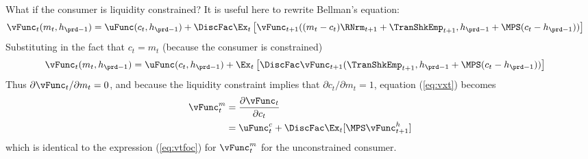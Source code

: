 \documentclass[\econtexRoot/SolvingMicroDSOPs]{subfiles}
\begin{document}
What if the consumer is liquidity constrained?  It is useful here to 
rewrite Bellman's equation:
\begin{equation}\begin{gathered}\begin{aligned}
  \vFunc_{t}(m_{t},h_{\prd-1})  & = \uFunc(c_{t},h_{\prd-1}) +  \DiscFac \Ex_{t}
                                   \left[{\vFunc}_{t+1}((m_{t}-c_{t})\RNrm_{t+1}+{\TranShkEmp}_{t+1},h_{\prd-1}+\MPS(c_{t}-h_{\prd-1}))
                                   \right] \nonumber
\end{aligned}\end{gathered}\end{equation}
Substituting in the fact that $c_{t}={m}_{t}$ (because the consumer is constrained)
\begin{equation}\begin{gathered}\begin{aligned}
  \vFunc_{t}(m_{t},h_{\prd-1})  & = \uFunc(c_{t},h_{\prd-1}) +  \Ex_{t}\left[\DiscFac
                                   \vFunc_{t+1}({\TranShkEmp}_{t+1},h_{\prd-1}+\MPS(c_{t}-h_{\prd-1}))\right]
                                   \nonumber
\end{aligned}\end{gathered}\end{equation}
Thus $\partial \vFunc_{t}/\partial m_{t} = 0$, and because the liquidity
constraint implies that $\partial c_{t}/\partial m_{t} = 1$,
equation (\ref{eq:vxt}) becomes
\begin{equation}\begin{gathered}\begin{aligned}
  \vFunc_{t}^m   & =  \frac{\partial \vFunc_{t}}{\partial c_{t}}
  \\              & = \uFunc_{t}^c + \DiscFac \Ex_{t} [\MPS \vFunc_{t+1}^{h}]
\end{aligned}\end{gathered}\end{equation}
which is identical to the expression (\ref{eq:vtfoc}) for $\vFunc_{t}^{m}$
for the unconstrained consumer.
\end{document}
